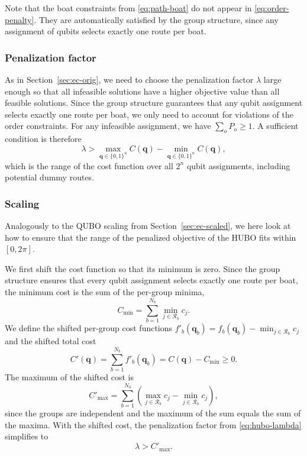 \documentclass{article}
\begin{document}
Note that the boat constraints from \eqref{eq:path-boat} do not appear in \eqref{eq:order-penalty}. They are automatically satisfied by the group structure, since any assignment of qubits selects exactly one route per boat.


\subsubsection{Penalization factor}
As in Section~\ref{sec:ec-orig}, we need to choose the penalization factor $\lambda$ large enough so that all infeasible solutions have a higher objective value than all feasible solutions.
Since the group structure guarantees that any qubit assignment selects exactly one route per boat, we only need to account for violations of the order constraints. For any infeasible assignment, we have $\sum_o P_o \geq 1$. A sufficient condition is therefore
\begin{equation}
    \lambda > \max_{\mathbf{q} \in \{0,1\}^n} C(\mathbf{q}) - \min_{\mathbf{q} \in \{0,1\}^n} C(\mathbf{q}),
    \label{eq:hubo-lambda}
\end{equation}
which is the range of the cost function over all $2^n$ qubit assignments, including potential dummy routes.


\subsubsection{Scaling}
\label{sec:hubo-scaling}
Analogously to the QUBO scaling from Section~\ref{sec:ec-scaled}, we here look at how to ensure that the range of the penalized objective of the HUBO fits within $[0, 2\pi]$.

We first shift the cost function so that its minimum is zero. Since the group structure ensures that every qubit assignment selects exactly one route per boat, the minimum cost is the sum of the per-group minima,
\begin{equation}
    C_{\min} = \sum_{b=1}^{N_b} \min_{j \in \mathcal{R}_b} c_j.
    \label{eq:hubo-cost-min}
\end{equation}
We define the shifted per-group cost functions $f'_b(\mathbf{q}_b) = f_b(\mathbf{q}_b) - \min_{j \in \mathcal{R}_b} c_j$ and the shifted total cost
\begin{equation}
    C'(\mathbf{q}) = \sum_{b=1}^{N_b} f'_b(\mathbf{q}_b) = C(\mathbf{q}) - C_{\min} \geq 0.
    \label{eq:hubo-cost-shifted}
\end{equation}
The maximum of the shifted cost is
\begin{equation}
    C'_{\max} = \sum_{b=1}^{N_b} \left( \max_{j \in \mathcal{R}_b} c_j - \min_{j \in \mathcal{R}_b} c_j \right),
    \label{eq:hubo-cost-range}
\end{equation}
since the groups are independent and the maximum of the sum equals the sum of the maxima.
With the shifted cost, the penalization factor from \eqref{eq:hubo-lambda} simplifies to
\begin{equation}
    \lambda > C'_{\max}.
    \label{eq:hubo-lambda-shifted}
\end{equation}
\end{document}
